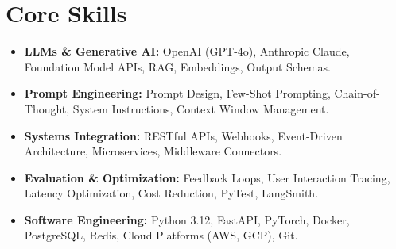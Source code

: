 \documentclass[a4paper,10pt]{article}
\begin{document}
\section{Core Skills}
\begin{itemize}
  \item \textbf{LLMs \& Generative AI:} OpenAI (GPT-4o), Anthropic Claude, Foundation Model APIs, RAG, Embeddings, Output Schemas.
  \item \textbf{Prompt Engineering:} Prompt Design, Few-Shot Prompting, Chain-of-Thought, System Instructions, Context Window Management.
  \item \textbf{Systems Integration:} RESTful APIs, Webhooks, Event-Driven Architecture, Microservices, Middleware Connectors.
  \item \textbf{Evaluation \& Optimization:} Feedback Loops, User Interaction Tracing, Latency Optimization, Cost Reduction, PyTest, LangSmith.
  \item \textbf{Software Engineering:} Python 3.12, FastAPI, PyTorch, Docker, PostgreSQL, Redis, Cloud Platforms (AWS, GCP), Git.
\end{itemize}
\end{document}
